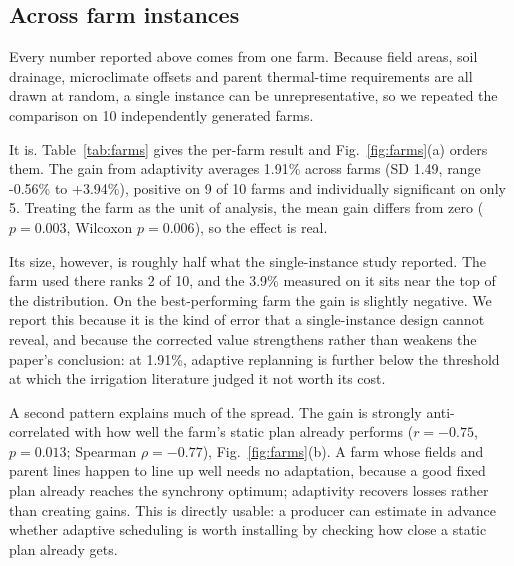 
\subsection{Across farm instances}

Every number reported above comes from one farm. Because field areas, soil
drainage, microclimate offsets and parent thermal-time requirements are all
drawn at random, a single instance can be unrepresentative, so we repeated
the comparison on 10 independently generated farms.

It is. Table~\ref{tab:farms} gives the per-farm result and
Fig.~\ref{fig:farms}(a) orders them. The gain from adaptivity averages
1.91\% across farms (SD 1.49, range -0.56\% to +3.94\%),
positive on 9 of 10 farms and individually significant on only
5. Treating the farm as the unit of analysis, the mean gain differs
from zero ($p = 0.003$, Wilcoxon $p = 0.006$), so the effect is real.

Its size, however, is roughly half what the single-instance study reported.
The farm used there ranks 2 of 10, and the 3.9\%
measured on it sits near the top of the distribution. On the best-performing
farm the gain is slightly negative. We report this because it is the kind of
error that a single-instance design cannot reveal, and because the corrected
value strengthens rather than weakens the paper's conclusion: at
1.91\%, adaptive replanning is further below the threshold at which the
irrigation literature judged it not worth its cost.

A second pattern explains much of the spread. The gain is strongly
anti-correlated with how well the farm's static plan already performs
($r = -0.75$, $p = 0.013$; Spearman $\rho = -0.77$),
Fig.~\ref{fig:farms}(b). A farm whose fields and parent lines happen to line
up well needs no adaptation, because a good fixed plan already reaches the
synchrony optimum; adaptivity recovers losses rather than creating gains.
This is directly usable: a producer can estimate in advance whether adaptive
scheduling is worth installing by checking how close a static plan already
gets.

